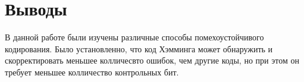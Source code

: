 \section{Выводы}
В данной работе были изучены различные способы помехоустойчивого кодирования. Было установленно, что код Хэмминга может обнаружить и скорректировать меньшее колличесвто ошибок, чем другие коды, но при этом он требует меньшее колличество контрольных бит.

